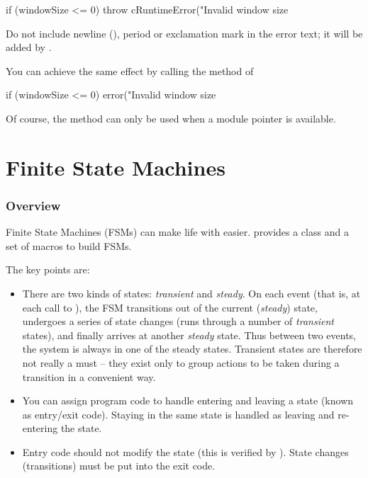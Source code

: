 \begin{cpp}
if (windowSize <= 0)
    throw cRuntimeError("Invalid window size %
\end{cpp}

Do not include newline (), period or exclamation mark
in the error text; it will be added by {\opp}.

You can achieve the same effect by calling the  method of

\begin{cpp}
if (windowSize <= 0)
    error("Invalid window size %
\end{cpp}

Of course, the  method can only be used when a module pointer
is available.



\section{Finite State Machines}
\label{sec:simple-modules:fsm}

\subsubsection{Overview}

Finite State Machines (FSMs)
can make life with  easier. {\opp} provides a
class and a set of macros to build FSMs.

The key points are:
\begin{itemize}
\item{There are two kinds of states:
    \textit{transient} and
    \textit{steady}. On each event (that is, at
    each call to ), the FSM transitions out of
    the current (\textit{steady}) state, undergoes a series of state
    changes (runs through a number of \textit{transient} states), and
    finally arrives at another \textit{steady} state. Thus between two
    events, the system is always in one of the steady states.
    Transient states are therefore not really a must -- they exist
    only to group actions to be taken during a transition in a
    convenient way.}
\item{You can assign program code to handle entering and leaving a state
    (known as entry/exit code).
    Staying in the same state is handled as leaving and re-entering
    the state.}
\item{Entry code should not modify the state (this is verified by
    {\opp}).  State changes (transitions) must be put into the exit
    code.}
\end{itemize}

